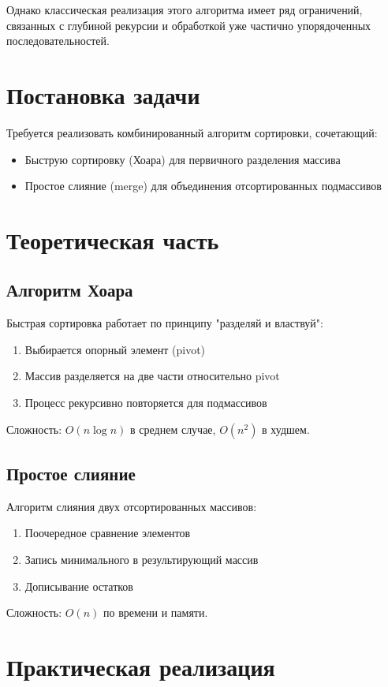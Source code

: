 \documentclass[a4paper,12pt]{article}
\begin{document}
Однако классическая реализация этого алгоритма имеет ряд ограничений, связанных с глубиной рекурсии и обработкой уже частично упорядоченных последовательностей.

\section{Постановка задачи}
Требуется реализовать комбинированный алгоритм сортировки, сочетающий:
\begin{itemize}
    \item Быструю сортировку (Хоара) для первичного разделения массива
    \item Простое слияние (merge) для объединения отсортированных подмассивов
\end{itemize}

\section{Теоретическая часть}
\subsection{Алгоритм Хоара}
Быстрая сортировка работает по принципу "разделяй и властвуй":
\begin{enumerate}
    \item Выбирается опорный элемент (pivot)
    \item Массив разделяется на две части относительно pivot
    \item Процесс рекурсивно повторяется для подмассивов
\end{enumerate}

Сложность: $O(n \log n)$ в среднем случае, $O(n^2)$ в худшем.

\subsection{Простое слияние}
Алгоритм слияния двух отсортированных массивов:
\begin{enumerate}
    \item Поочередное сравнение элементов
    \item Запись минимального в результирующий массив
    \item Дописывание остатков
\end{enumerate}

Сложность: $O(n)$ по времени и памяти.

\section{Практическая реализация}
\end{document}
